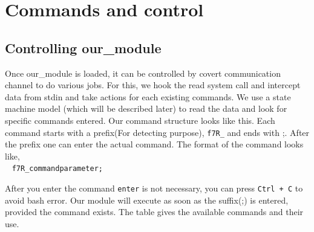\documentclass[10pt, letterpaper]{scrartcl}
\begin{document}
\section{Commands and control}
    \subsection{Controlling our\_module}
    Once our\_module is loaded, it can be controlled by covert communication channel to do various jobs. 
For this, we hook the read system call and intercept data from stdin and take actions for each existing  commands. 
We use a state machine model (which will be described later) to read the data and look for specific commands entered. 
Our command structure looks like this.
Each command starts with a prefix(For detecting purpose), \texttt{f7R\_} and ends with ;. 
After the prefix one can enter the actual command. The format of the command looks like,
\\~
\texttt{f7R\_command\textvisiblespace parameter;}

After you enter the command \texttt{enter} is not necessary, you can press \texttt{Ctrl + C} to avoid bash error. 
Our module will execute as soon as the suffix(;) is entered, provided the command exists. 
The table %
gives the available commands and their use. 
\end{document}
